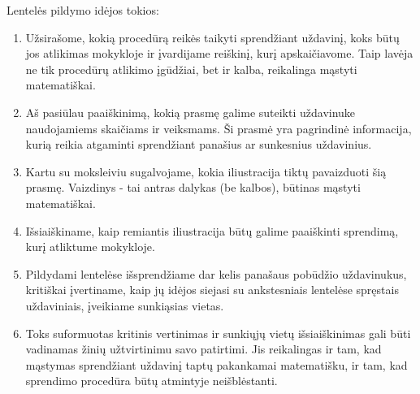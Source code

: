 \documentclass[a4paper,png]{article}
\newcommand{\fillup}[1]{\begin{tabular}{m{0.95\linewidth}m{0.05\linewidth}}#1 & \phantom{$\begin{array}{c}.\\.\end{array}$}\end{tabular}}
\begin{document}
\renewcommand{\fillup}[1]{\begin{tabular}{m{0.95\linewidth}m{0.05\linewidth}}#1 & \phantom{$\begin{array}{c}.\\.\\.\\.\\.\end{array}$}\end{tabular}}

Lentelės pildymo idėjos tokios: 
\begin{enumerate}
\item Užsirašome, kokią procedūrą reikės taikyti sprendžiant uždavinį, koks būtų jos atlikimas mokykloje ir įvardijame reiškinį, kurį apskaičiavome. Taip lavėja ne tik procedūrų atlikimo įgūdžiai, bet ir kalba, reikalinga mąstyti matematiškai.
\item Aš pasiūlau paaiškinimą, kokią prasmę galime suteikti uždavinuke naudojamiems skaičiams ir veiksmams. Ši prasmė yra pagrindinė informacija, kurią reikia atgaminti sprendžiant panašius ar sunkesnius uždavinius.
\item Kartu su moksleiviu sugalvojame, kokia iliustracija tiktų pavaizduoti šią prasmę. Vaizdinys - tai antras dalykas (be kalbos), būtinas mąstyti matematiškai.
\item Išsiaiškiname, kaip remiantis iliustracija būtų galime paaiškinti sprendimą, kurį atliktume mokykloje.
\item Pildydami lentelėse išsprendžiame dar kelis panašaus pobūdžio uždavinukus, kritiškai įvertiname, kaip jų idėjos siejasi su ankstesniais lentelėse spręstais uždaviniais, įveikiame sunkiąsias vietas.
\item Toks suformuotas kritinis vertinimas ir sunkiųjų vietų išsiaiškinimas gali būti vadinamas žinių užtvirtinimu savo patirtimi. Jis reikalingas ir tam, kad mąstymas sprendžiant uždavinį taptų pakankamai matematišku, ir tam, kad sprendimo procedūra būtų atmintyje neišblėstanti.
\end{enumerate}
\end{document}
